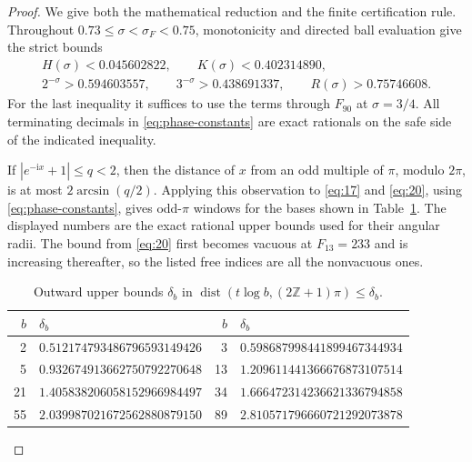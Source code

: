 \documentclass[11pt]{article}
\theoremstyle{remark}
\newcommand{\ii}{\mathrm{i}}
\begin{document}
\begin{proof}
We give both the mathematical reduction and the finite certification rule.
Throughout $0.73\leq\sigma<\sigma_F<0.75$, monotonicity and directed ball
evaluation give the strict bounds
\begin{equation}\label{eq:phase-constants}
\begin{gathered}
 H(\sigma)<0.045602822,\qquad K(\sigma)<0.402314890,\\
 2^{-\sigma}>0.594603557,\qquad
 3^{-\sigma}>0.438691337,\qquad
 R(\sigma)>0.75746608.
\end{gathered}
\end{equation}
For the last inequality it suffices to use the terms through $F_{90}$ at
$\sigma=3/4$.  All terminating decimals in \eqref{eq:phase-constants} are
exact rationals on the safe side of the indicated inequality.

If $|e^{-\ii x}+1|\leq q<2$, then the distance of $x$ from an odd multiple
of $\pi$, modulo $2\pi$, is at most $2\arcsin(q/2)$.  Applying this observation
to \eqref{eq:17} and \eqref{eq:20}, using
\eqref{eq:phase-constants}, gives odd-$\pi$ windows for the bases shown in
Table~\ref{tab:angular-bounds}.  The displayed numbers are the exact rational
upper bounds used for their angular radii.  The bound from \eqref{eq:20}
first becomes vacuous at $F_{13}=233$ and is increasing thereafter, so the
listed free indices are all the nonvacuous ones.

\begin{table}[ht]
\centering
\caption{Outward upper bounds $\delta_b$ in
$\operatorname{dist}(t\log b,(2\mathbb Z+1)\pi)\leq\delta_b$.}
\label{tab:angular-bounds}
\small
\begin{tabular}{r@{\quad}l r@{\quad}l}
\toprule
$b$&$\delta_b$&$b$&$\delta_b$\\
\midrule
2  &$0.512174793486796593149426$&3  &$0.598687998441899467344934$\\
5  &$0.932674913662750792270648$&13 &$1.209611441366676873107514$\\
21 &$1.405838206058152966984497$&34 &$1.666472314236621336794858$\\
55 &$2.039987021672562880879150$&89 &$2.810571796660721292073878$\\
\bottomrule
\end{tabular}
\end{table}


\end{proof}
\end{document}
